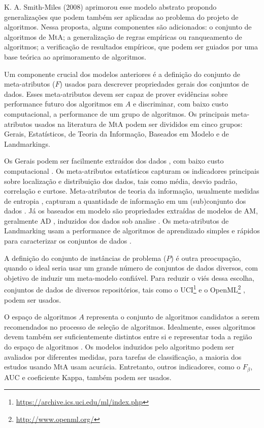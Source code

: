 K. A. Smith-Miles (2008) \cite{SmithMiles2008} 
aprimorou esse modelo abstrato propondo generalizações que podem também ser aplicadas ao problema do projeto de algoritmos.
Nessa proposta, alguns componentes são adicionados: o conjunto de algoritmos de MtA; a generalização de regras empíricas ou ranqueamento de algoritmos; a verificação de resultados empíricos, que podem ser guiados por uma base teórica ao aprimoramento de algoritmos.

Um componente crucial dos modelos anteriores é a definição do conjunto de meta-atributos ($F$) usados para descrever propriedades gerais dos conjuntos de dados.
Esses meta-atributos devem ser capaz de prover evidências sobre performance futuro dos algoritmos em $A$ \cite{Soares2001, Reif2012}
e discriminar, com baixo custo computacional, a performance de um grupo de algoritmos.
Os principais meta-atributos usados na literatura de MtA podem ser divididos em cinco grupos: Gerais, Estatísticos, de Teoria da Informação, Baseados em Modelo e de Landmarkings.

Os Gerais podem ser facilmente extraídos dos dados \cite{Reif2014}, com baixo custo computacional \cite{Reif2012}.
Os meta-atributos estatísticos capturam os indicadores principais sobre localização e distribuição dos dados, tais como média, desvio padrão, correlação e curtose.
Meta-atributos de teoria da informação, usualmente medidas de entropia \cite{Segrera2008}, capturam a quantidade de informação em um (sub)conjunto dos dados \cite{SmithMiles2008}.
Já os baseados em modelo são propriedades extraídas de modelos de AM, geralmente AD \cite{Bensusan2000, Peng2002}, induzidos dos dados sob analise \cite{Reif2014}.
Os meta-atributos de Landmarking usam a performance de algoritmos de aprendizado simples e rápidos para caracterizar os conjuntos de dados \cite{SmithMiles2008}. 

A definição do conjunto de instâncias de problema ($P$) é outra preocupação, quando o ideal seria usar um grande número de conjuntos de dados diversos, com objetivo de induzir um meta-modelo confiável.
Para reduzir o viés dessa escolha, conjuntos de dados de diversos repositórios, tais como o UCI\footnote{\url{https://archive.ics.uci.edu/ml/index.php}} \cite{Lichman2013} e o OpenML\footnote{\url{http://www.openml.org/}} \cite{OpenML2013}, podem ser usados.

O espaço de algoritmos $A$ representa o conjunto de algoritmos candidatos a serem recomendados no processo de seleção de algoritmos.
Idealmente, esses algoritmos devem também ser suficientemente distintos entre si e representar toda a região do espaço de algoritmos \cite{Munoz2018}. 
Os modelos induzidos pelo algoritmo podem ser avaliados por diferentes medidas, para tarefas de classificação, a maioria dos estudos usando MtA usam acurácia. Entretanto, outros indicadores, como o $F_\beta$, AUC e coeficiente Kappa, também podem ser usados.

